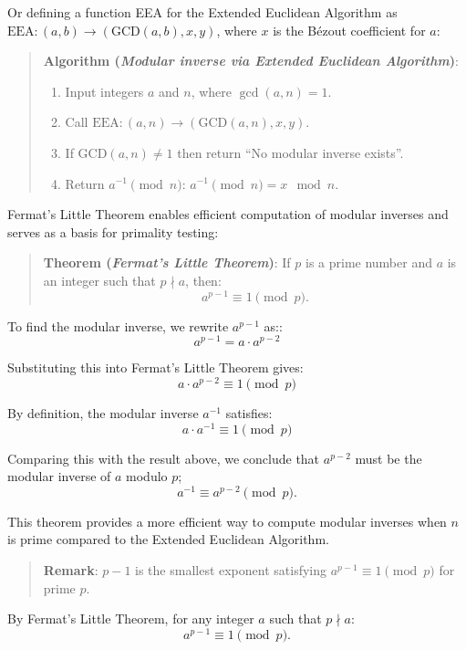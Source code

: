 \documentclass[
  letterpaper,
  DIV=11,
  numbers=noendperiod,
  oneside]{scrartcl}
\begin{document}
Or defining a function EEA for the Extended Euclidean Algorithm as
\(\text{EEA}: (a, b) \to (\text{GCD}(a, b), x, y)\), where \(x\) is the
Bézout coefficient for \(a\):

\begin{quote}
\textbf{Algorithm (\emph{Modular inverse via Extended Euclidean
Algorithm})}:

\begin{enumerate}
\def\labelenumi{\arabic{enumi}.}
\item
  Input integers \(a\) and \(n\), where \(\gcd(a, n) = 1\).
\item
  Call \(\text{EEA}: (a, n) \to (\text{GCD}(a, n), x, y)\).
\item
  If \(\text{GCD}(a, n) \neq 1\) then return ``No modular inverse
  exists''.
\item
  Return \(a^{-1} \pmod{n}\): \(a^{-1} \pmod{n} = x \mod n\).
\end{enumerate}
\end{quote}

Fermat's Little Theorem enables efficient computation of modular
inverses and serves as a basis for primality testing:

\begin{quote}
\textbf{Theorem (\emph{Fermat's Little Theorem})}: If \(p\) is a prime
number and \(a\) is an integer such that \(p \nmid a\), then: \[
a^{p-1} \equiv 1 \pmod{p}.
\]
\end{quote}

To find the modular inverse, we rewrite \(a^{p-1}\) as:: \[
a^{p-1} = a \cdot a^{p-2}
\]

Substituting this into Fermat's Little Theorem gives: \[
a \cdot a^{p-2} \equiv 1 \pmod{p}
\]

By definition, the modular inverse \(a^{-1}\) satisfies: \[
a \cdot a^{-1} \equiv 1 \pmod{p}
\]

Comparing this with the result above, we conclude that \(a^{p-2}\) must
be the modular inverse of \(a\) modulo \(p\); \[
a^{-1} \equiv a^{p-2} \pmod{p}.
\]

This theorem provides a more efficient way to compute modular inverses
when \(n\) is prime compared to the Extended Euclidean Algorithm.

\begin{quote}
\textbf{Remark}: \(p-1\) is the smallest exponent satisfying
\(a^{p-1} \equiv 1 \pmod{p}\) for prime \(p\).
\end{quote}

By Fermat's Little Theorem, for any integer \(a\) such that
\(p \nmid a\): \[
a^{p-1} \equiv 1 \pmod{p}.
\]
\end{document}
